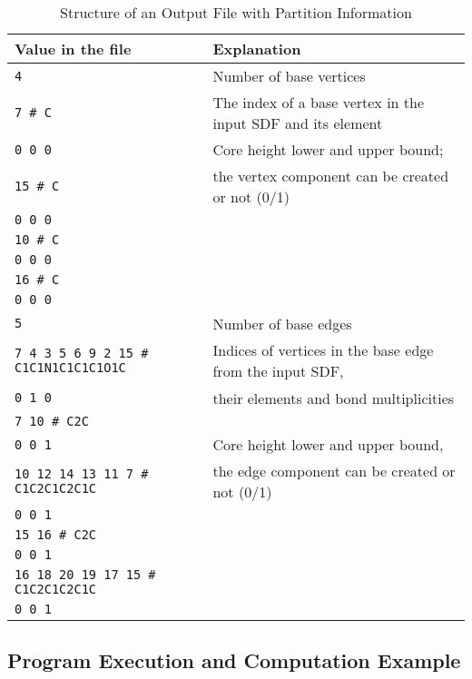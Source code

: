 \documentclass[11pt,titlepage,dvipdfmx,twoside]{article}
\begin{document}
\bigskip
\begin{table}[H]
\begin{center} \caption{Structure of an Output File with Partition Information}
\label{tab:PartitionFormat}
  \begin{tabular}{l|l}
  Value in the file & Explanation \\ \hline \hline
{\tt  4} & Number of base vertices \\ \hline
{\tt  7 \# C} & The index of a base vertex in the input SDF and its element\\
{\tt  0 0 0} & Core height lower and upper bound; \\
{\tt  15 \# C} & \hspace{10mm} the vertex component can be created or not (0/1) \\
{\tt  0 0 0} & \\
{\tt  10 \# C} & \\
{\tt  0 0 0} & \\ 
{\tt  16 \# C} &\\ 
{\tt  0 0 0} & \\ \hline
{\tt  5} & Number of base edges　\\ \hline
{\tt  7 4 3 5 6 9 2 15 \# C1C1N1C1C1C1O1C} & Indices of vertices in the base edge from the input SDF,\\
{\tt  0 1 0} & \hspace{10mm} their elements and bond multiplicities　\\
{\tt  7 10 \# C2C} &\\ 
{\tt  0 0 1} &Core height lower and upper bound,\\
{\tt  10 12 14 13 11 7 \# C1C2C1C2C1C} &\hspace{10mm} the edge component can be created or not (0/1) \\
{\tt  0 0 1} & \\
{\tt  15 16 \# C2C} & \\
{\tt  0 0 1} & \\
{\tt  16 18 20 19 17 15 \# C1C2C1C2C1C} & \\
{\tt  0 0 1} & \\ \hline
  \end{tabular}
\end{center}
\end{table}



\subsection{Program Execution and Computation Example}
\label{sec:Example_p}
\end{document}
